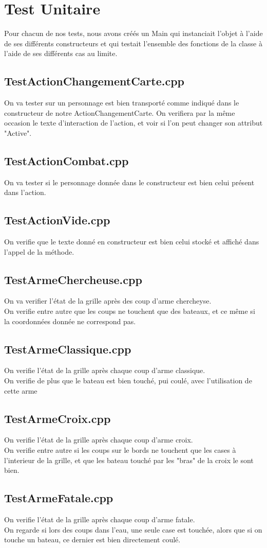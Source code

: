 \chapter{Test Unitaire}
    Pour chacun de nos tests, nous avons créés un Main qui instanciait l'objet à l'aide de ses différents constructeurs et qui testait l'ensemble des fonctions de la classe à l'aide de ses différents cas au limite.
    \section{TestActionChangementCarte.cpp}
        On va tester sur un personnage est bien transporté comme indiqué dans le constructeur de notre ActionChangementCarte. On verifiera par la même occasion le texte d'interaction de l'action, et voir si l'on peut changer son attribut "Active".
    \section{TestActionCombat.cpp}
        On va tester si le personnage donnée dans le constructeur est bien celui présent dans l'action.
    \section{TestActionVide.cpp}
        On verifie que le texte donné en constructeur est bien celui stocké et affiché dans l'appel de la méthode.
    \section{TestArmeChercheuse.cpp}
        On va verifier l'état de la grille après des coup d'arme chercheyse.\\
        On verifie entre autre que les coups ne touchent que des bateaux, et ce même si la coordonnées donnée ne correspond pas.
    \section{TestArmeClassique.cpp}
        On verifie l'état de la grille après chaque coup d'arme classique.\\
        On verifie de plus que le bateau est bien touché, pui coulé, avec l'utilisation de cette arme
    \section{TestArmeCroix.cpp}
        On verifie l'état de la grille après chaque coup d'arme croix.\\
        On verifie entre autre si les coups sur le bords ne touchent que les cases à l'interieur de la grille, et que les bateau touché par les "bras" de la croix le sont bien.
    \section{TestArmeFatale.cpp}
        On verifie l'état de la grille après chaque coup d'arme fatale.\\
        On regarde si lors des coups dans l'eau, une seule case est touchée, alors que si on touche un bateau, ce dernier est bien directement coulé.
